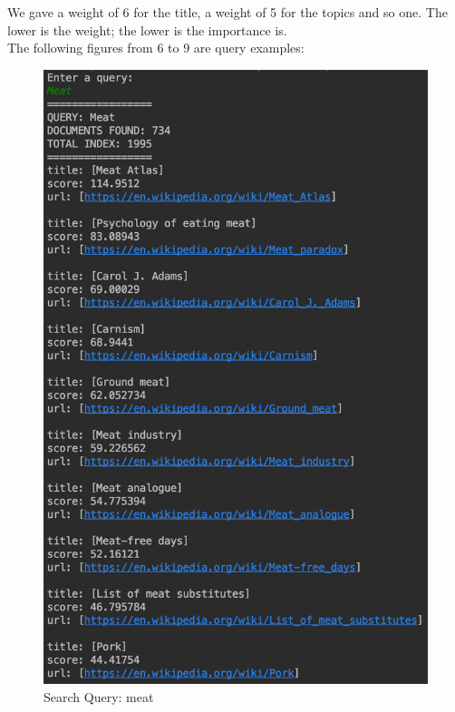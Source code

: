 \documentclass[a4paper]{article}
\begin{document}
We gave a weight of 6 for the title, a weight of 5 for the topics and so one. The lower is the weight; the lower is the importance is.\\

The following figures from 6 to 9 are query examples:

\begin{figure}[H]
  
  \begin{minipage}[b]{0.4\textwidth}
    \includegraphics[width=\textwidth]{imgs/meat}
    \caption{Search Query: meat}
    \label{fig:meat}
  \end{minipage}
  \hfill
  \begin{minipage}[b]{0.4\textwidth}

\end{minipage}
\end{figure}
\end{document}
